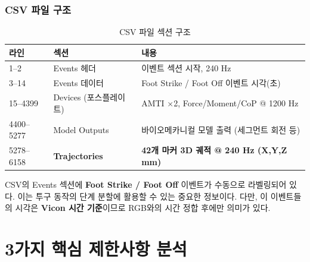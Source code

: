 \documentclass[11pt, a4paper]{report}
\begin{document}
\subsection{CSV 파일 구조}

\begin{table}[H]
\centering
\caption{CSV 파일 섹션 구조}
\label{tab:csv_structure}
\renewcommand{\arraystretch}{1.2}
\begin{tabular}{lll}
\toprule
\textbf{라인} & \textbf{섹션} & \textbf{내용} \\
\midrule
1--2 & Events 헤더 & 이벤트 섹션 시작, 240 Hz \\
3--14 & Events 데이터 & Foot Strike / Foot Off 이벤트 시각(초) \\
15--4399 & Devices (포스플레이트) & AMTI $\times$2, Force/Moment/CoP @ 1200 Hz \\
4400--5277 & Model Outputs & 바이오메카니컬 모델 출력 (세그먼트 회전 등) \\
5278--6158 & \textbf{Trajectories} & \textbf{42개 마커 3D 궤적 @ 240 Hz (X,Y,Z mm)} \\
\bottomrule
\end{tabular}
\end{table}

\begin{importantnote}
CSV의 Events 섹션에 \textbf{Foot Strike / Foot Off} 이벤트가 수동으로 라벨링되어 있다.
이는 투구 동작의 단계 분할에 활용할 수 있는 중요한 정보이다.
다만, 이 이벤트들의 시각은 \textbf{Vicon 시간 기준}이므로
RGB와의 시간 정합 후에만 의미가 있다.
\end{importantnote}


\chapter{3가지 핵심 제한사항 분석}
\label{ch:constraints}
\end{document}
